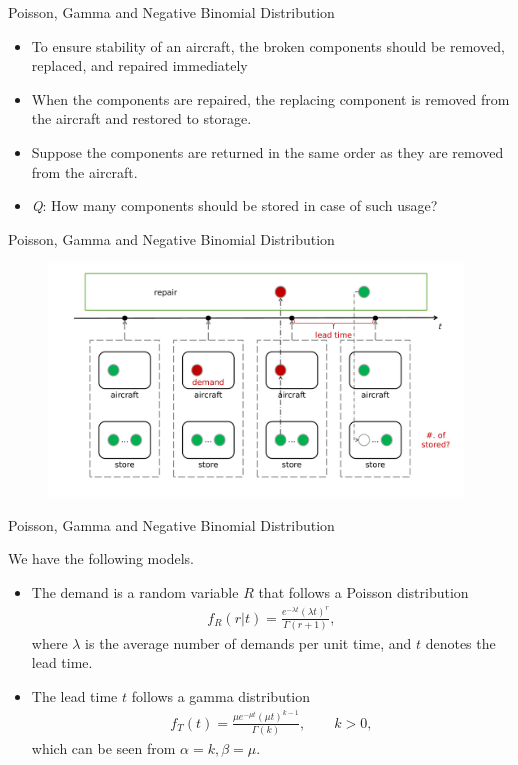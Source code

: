 \begin{frame}{Poisson, Gamma and Negative Binomial Distribution}

\begin{itemize}
	\justifying
	\item To ensure stability of an aircraft, the broken components should be removed, replaced, and repaired immediately
	\item When the components are repaired, the replacing component is removed from the aircraft and restored to storage.
	\item Suppose the components are returned in the same order as they are removed from the aircraft.
	\item \emph{Q}: How many components should be stored in case of such usage?
\end{itemize}


\end{frame}


\begin{frame}{Poisson, Gamma and Negative Binomial Distribution}

\begin{figure}[htbp]
	\centering
	\includegraphics[width=11cm]{./images/rc2fig7.pdf}
\end{figure}


\end{frame}


\begin{frame}{Poisson, Gamma and Negative Binomial Distribution}

 We have the following models.
\begin{itemize}
	\justifying
	\item The demand is a random variable $R$ that follows a Poisson distribution
	\begin{align*}
	f_R(r|t) = \frac{e^{-\lambda t}(\lambda t)^r}{\Gamma(r + 1)},
	\end{align*}
	where $\lambda$ is the average number of demands per unit time, and $t$ denotes the lead time.
	\item The lead time $t$ follows a gamma distribution
	\begin{align*}
	f_T(t) = \frac{\mu e^{-\mu t} (\mu t)^{k-1}}{\Gamma(k)}, \qquad k > 0,
	\end{align*}
	which can be seen from $\alpha = k, \beta = \mu$.
\end{itemize}


\end{frame}

